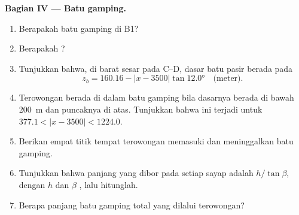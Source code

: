 \begin{problem}
\medskip
\noindent\textbf{Bagian IV --- Batu gamping.}
\begin{enumerate}[resume]
  \item Berapakah  batu gamping di B1?
  \item Berapakah ?
  \item Tunjukkan bahwa, di barat sesar pada C--D, dasar batu pasir berada pada
        \[ z_b = 160.16 - |x - 3500|\tan\ang{12.0} \quad\text{(meter)}. \]
  \item Terowongan berada di dalam batu gamping bila dasarnya berada di bawah \qty{200}{m} dan puncaknya di atas. Tunjukkan bahwa ini terjadi untuk $377.1 < |x - 3500|
        < 1224.0$.
  \item Berikan empat titik tempat terowongan memasuki dan meninggalkan batu gamping.
  \item Tunjukkan bahwa panjang yang dibor pada setiap sayap adalah $h/\tan\beta$, dengan $h$  dan $\beta$ , lalu hitunglah.
  \item Berapa panjang batu gamping total yang dilalui terowongan?
\end{enumerate}
\end{problem}
